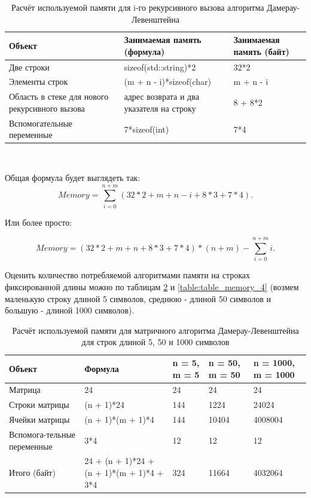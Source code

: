 \documentclass[a4paper,12pt]{article}
\begin{document}
	
	\begin{table} [h!]
	\begin{center}
	\caption{Расчёт используемой памяти для i-го рекурсивного вызова алгоритма Дамерау-Левенштейна}
	\begin{tabular}{|p{4cm}|p{6cm}|p{5cm}|}
	\hline 
	Объект & Занимаемая память (формула)  & Занимаемая память (байт) \\ 
	\hline 
	Две строки & sizeof(std::string)*2 & 32*2 \\ 
	\hline 
	Элементы строк  & (m + n - i)*sizeof(char) & m + n - i \\ 
	\hline 
	Область в стеке для нового рекурсивного вызова & адрес возврата и два указателя на строку & 8 + 8*2 \\ 
	\hline 
	Вспомогательные переменные  & 7*sizeof(int) & 7*4 \\ 
	\hline 
	\end{tabular} \\

    \label{table:table_memory_2}
    \end{center}
	\end{table}
	
	Общая формула будет выглядеть так:
	\begin{equation}
	Memory = \sum_{i=0}^{n + m} (32*2 + m + n - i + 8*3 + 7*4).
	\label{eq:mem_2}
	\end{equation}
	
	Или более просто:
	
	\[ Memory = (32*2 + m + n + 8*3 + 7*4)*(n + m) - \sum_{i=0}^{n + m}i. \]
	


	Оценить количество потребляемой алгоритмами памяти на строках фиксированной длины можно по таблицам \ref{table:table_memory_3} и \ref{table:table_memory_4} (возмем маленькую строку длиной 5 символов, среднюю - длиной 50 символов и большую - длиной 1000 символов).
	
	
	\begin{table} [h!]	
	\begin{center}
	\caption{Расчёт используемой памяти для матричного алгоритма Дамерау-Левенштейна для строк длиной 5, 50 и 1000 символов}
	\begin{tabular}{|p{3cm}|p{4cm}|p{1.2cm}|p{1.5cm}|p{2cm}|}

	\hline 
	Объект & Формула & n = 5, m = 5	& n = 50, m = 50 & n = 1000, m = 1000 \\ 
	\hline 
	Матрица & 24 & 24 & 24 & 24 \\ 
	\hline 
	Строки матрицы & (n + 1)*24 & 144 & 1224 & 24024 \\ 
	\hline 
	Ячейки матрицы & (n + 1)*(m + 1)*4 & 144 & 10404 & 4008004 \\ 
	\hline 
	Вспомога-тельные переменные & 3*4 & 12 & 12 & 12 \\ 
	\hline 
	Итого (байт) & 24 + (n + 1)*24 + (n + 1)*(m + 1)*4 + 3*4 & 324 & 11664 & 4032064 \\ 

	\hline 
	\end{tabular} \\
    \label{table:table_memory_3}
    \end{center}
	\end{table}
	
\end{document}
